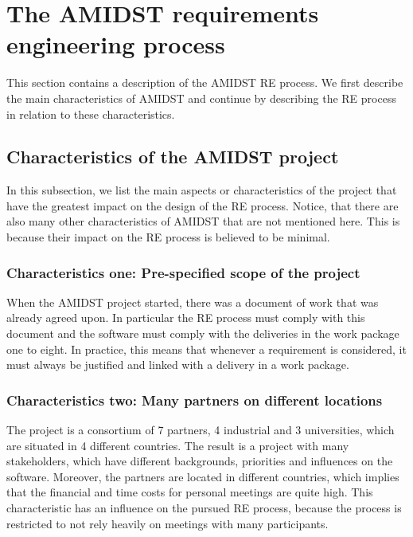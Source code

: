 \documentclass[11pt, oneside]{article}   	%
\begin{document}
\section{The AMIDST requirements engineering process}
\label{sec:AmidstRequirementProcess}

This section contains a description of the AMIDST RE process.  We first describe the main characteristics of AMIDST and continue by describing the RE process in relation to these characteristics.

\subsection{Characteristics of the AMIDST project}
\label{sec:characteristics}

In this subsection, we list the main aspects or characteristics of the project that have the greatest impact on the design of the RE process.  Notice, that there are also many other characteristics of AMIDST that are not mentioned here.  This is because their impact on the RE process is believed to be minimal.  


\subsubsection*{Characteristics one:  Pre-specified scope of the project}
\label{sec:characteristic1}

When the AMIDST project started, there was a document of work that was already agreed upon.  In particular the RE process must comply with this document and the software must comply with the deliveries in the work package one to eight.  In practice, this means that whenever a requirement is considered, it must always be justified and linked with a delivery in a work package.

\subsubsection*{Characteristics two: Many partners on different locations}
\label{sec:characteristic2}
The project is a consortium of 7 partners, 4 industrial and 3 universities, which are situated in 4 different countries.  The result is a project with many stakeholders, which have different backgrounds, priorities and influences on the software. Moreover, the partners are located in different countries, which implies that the financial and time costs for personal meetings are quite high.  This characteristic has an influence on the pursued RE process, because the process is restricted to not rely heavily on meetings with many participants.
\end{document}
